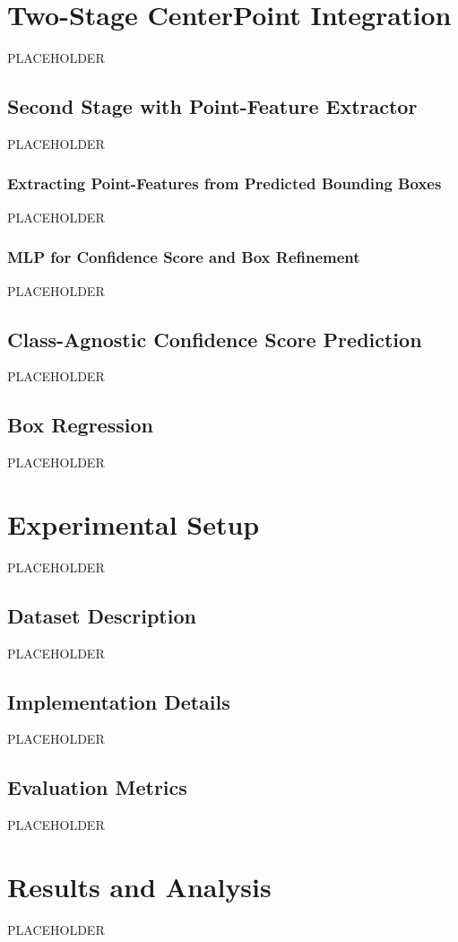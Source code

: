 \documentclass[times, report, parskip, openbib, twocolumn]{article}
\begin{document}
\section{Two-Stage CenterPoint Integration}
PLACEHOLDER

\subsection{Second Stage with Point-Feature Extractor}
PLACEHOLDER

\subsubsection{Extracting Point-Features from Predicted Bounding Boxes}
PLACEHOLDER

\subsubsection{MLP for Confidence Score and Box Refinement}
PLACEHOLDER

\subsection{Class-Agnostic Confidence Score Prediction}
PLACEHOLDER

\subsection{Box Regression}
PLACEHOLDER

\section{Experimental Setup}
PLACEHOLDER

\subsection{Dataset Description}
PLACEHOLDER

\subsection{Implementation Details}
PLACEHOLDER

\subsection{Evaluation Metrics}
PLACEHOLDER

\section{Results and Analysis}
PLACEHOLDER
\end{document}
